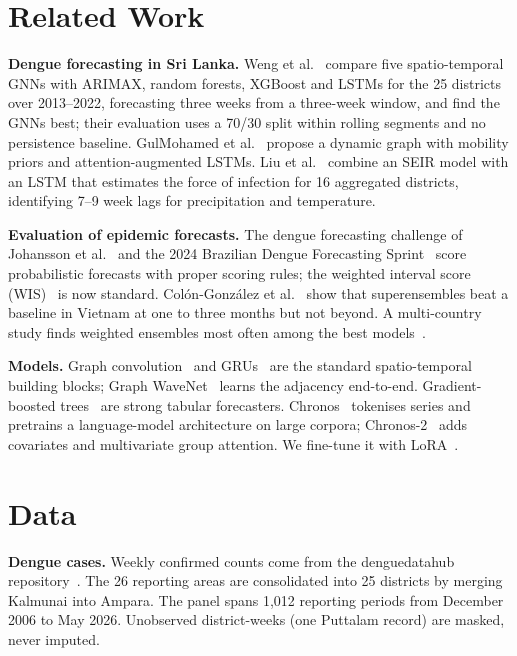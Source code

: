\section{Related Work}

\textbf{Dengue forecasting in Sri Lanka.} Weng et al.~\cite{weng2024graph} compare five spatio-temporal GNNs with ARIMAX, random forests, XGBoost and LSTMs for the 25 districts over 2013--2022, forecasting three weeks from a three-week window, and find the GNNs best; their evaluation uses a 70/30 split within rolling segments and no persistence baseline. GulMohamed et al.~\cite{gulmohamed2026denguegnn} propose a dynamic graph with mobility priors and attention-augmented LSTMs. Liu et al.~\cite{liu2025explainable} combine an SEIR model with an LSTM that estimates the force of infection for 16 aggregated districts, identifying 7--9 week lags for precipitation and temperature.

\textbf{Evaluation of epidemic forecasts.} The dengue forecasting challenge of Johansson et al.~\cite{johansson2019open} and the 2024 Brazilian Dengue Forecasting Sprint~\cite{mosqlimate2026sprint} score probabilistic forecasts with proper scoring rules; the weighted interval score (WIS)~\cite{bracher2021evaluating} is now standard. Colón-González et al.~\cite{colongonzalez2021probabilistic} show that superensembles beat a baseline in Vietnam at one to three months but not beyond. A multi-country study finds weighted ensembles most often among the best models~\cite{ensemble2025global}.

\textbf{Models.} Graph convolution~\cite{kipf2017gcn} and GRUs~\cite{cho2014gru} are the standard spatio-temporal building blocks; Graph WaveNet~\cite{wu2019graph} learns the adjacency end-to-end. Gradient-boosted trees~\cite{ke2017lightgbm} are strong tabular forecasters. Chronos~\cite{ansari2024chronos} tokenises series and pretrains a language-model architecture on large corpora; Chronos-2~\cite{ansari2025chronos2} adds covariates and multivariate group attention. We fine-tune it with LoRA~\cite{hu2022lora}.

\section{Data}
\label{sec:data}

\textbf{Dengue cases.} Weekly confirmed counts come from the denguedatahub repository~\cite{talagala2026denguedatahub}. The 26 reporting areas are consolidated into 25 districts by merging Kalmunai into Ampara. The panel spans 1,012 reporting periods from December 2006 to May 2026. Unobserved district-weeks (one Puttalam record) are masked, never imputed.

